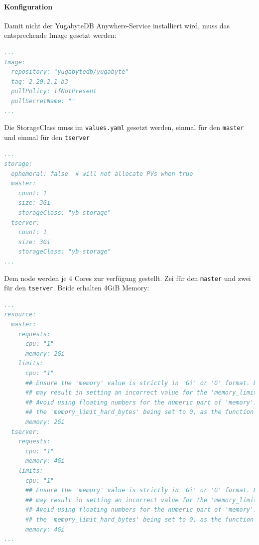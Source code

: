 \begin{flushleft}
    \paragraph{Konfiguration}
    Damit nicht der YugabyteDB Anywhere-Service installiert wird, muss das entsprechende Image gesetzt werden:
    \lstset{style=gra_codestyle}
    \begin{lstlisting}[language=yaml, caption=yugabyteDB - Helm Chart Manifest - Detail Image,captionpos=b,label={lst:yugabytedb-image-setting},breaklines=true]
...
Image:
  repository: "yugabytedb/yugabyte"
  tag: 2.20.2.1-b3
  pullPolicy: IfNotPresent
  pullSecretName: ""
...
    \end{lstlisting}

    Die StorageClass muss im \texttt{values.yaml} gesetzt werden, einmal für den \texttt{master} und einmal für den \texttt{tserver}
    \lstset{style=gra_codestyle}
    \begin{lstlisting}[language=yaml, caption=yugabyteDB - Helm Chart Manifest - Detail StorageClass,captionpos=b,label={lst:yugabytedb-storageclass-setting},breaklines=true]
...
storage:
  ephemeral: false  # will not allocate PVs when true
  master:
    count: 1
    size: 3Gi
    storageClass: "yb-storage"
  tserver:
    count: 1
    size: 3Gi
    storageClass: "yb-storage"
...
    \end{lstlisting}

    Dem node werden je 4 Cores zur verfügung gestellt.
    Zei für den \texttt{master} und zwei für den \texttt{tserver}.
    Beide erhalten 4GiB Memory:
    \lstset{style=gra_codestyle}
    \begin{lstlisting}[language=yaml, caption=yugabyteDB - Helm Chart Manifest - Detail Resources,captionpos=b,label={lst:yugabytedb-resources-setting},breaklines=true]
...
resource:
  master:
    requests:
      cpu: "1"
      memory: 2Gi
    limits:
      cpu: "1"
      ## Ensure the 'memory' value is strictly in 'Gi' or 'G' format. Deviating from these formats
      ## may result in setting an incorrect value for the 'memory_limit_hard_bytes' flag.
      ## Avoid using floating numbers for the numeric part of 'memory'. Doing so may lead to
      ## the 'memory_limit_hard_bytes' being set to 0, as the function expects integer values.
      memory: 2Gi
  tserver:
    requests:
      cpu: "1"
      memory: 4Gi
    limits:
      cpu: "1"
      ## Ensure the 'memory' value is strictly in 'Gi' or 'G' format. Deviating from these formats
      ## may result in setting an incorrect value for the 'memory_limit_hard_bytes' flag.
      ## Avoid using floating numbers for the numeric part of 'memory'. Doing so may lead to
      ## the 'memory_limit_hard_bytes' being set to 0, as the function expects integer values.
      memory: 4Gi
...
    \end{lstlisting}


\end{flushleft}
